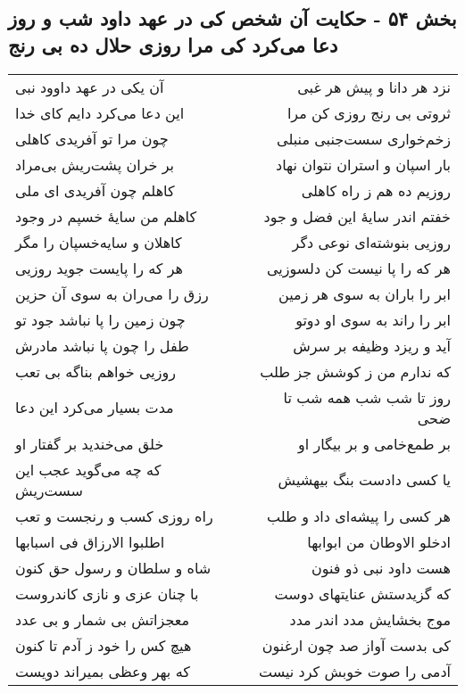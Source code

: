 \begin{center}
\section*{بخش ۵۴ - حکایت آن شخص کی در عهد داود شب و روز دعا می‌کرد کی مرا روزی حلال ده بی رنج}
\label{sec:sh054}
\begin{longtable}{l p{0.5cm} r}
آن یکی در عهد داوود نبی
&&
نزد هر دانا و پیش هر غبی
\\
این دعا می‌کرد دایم کای خدا
&&
ثروتی بی رنج روزی کن مرا
\\
چون مرا تو آفریدی کاهلی
&&
زخم‌خواری سست‌جنبی منبلی
\\
بر خران پشت‌ریش بی‌مراد
&&
بار اسپان و استران نتوان نهاد
\\
کاهلم چون آفریدی ای ملی
&&
روزیم ده هم ز راه کاهلی
\\
کاهلم من سایهٔ خسپم در وجود
&&
خفتم اندر سایهٔ این فضل و جود
\\
کاهلان و سایه‌خسپان را مگر
&&
روزیی بنوشته‌ای نوعی دگر
\\
هر که را پایست جوید روزیی
&&
هر که را پا نیست کن دلسوزیی
\\
رزق را می‌ران به سوی آن حزین
&&
ابر را باران به سوی هر زمین
\\
چون زمین را پا نباشد جود تو
&&
ابر را راند به سوی او دوتو
\\
طفل را چون پا نباشد مادرش
&&
آید و ریزد وظیفه بر سرش
\\
روزیی خواهم بناگه بی تعب
&&
که ندارم من ز کوشش جز طلب
\\
مدت بسیار می‌کرد این دعا
&&
روز تا شب شب همه شب تا ضحی
\\
خلق می‌خندید بر گفتار او
&&
بر طمع‌خامی و بر بیگار او
\\
که چه می‌گوید عجب این سست‌ریش
&&
یا کسی دادست بنگ بیهشیش
\\
راه روزی کسب و رنجست و تعب
&&
هر کسی را پیشه‌ای داد و طلب
\\
اطلبوا الارزاق فی اسبابها
&&
ادخلو الاوطان من ابوابها
\\
شاه و سلطان و رسول حق کنون
&&
هست داود نبی ذو فنون
\\
با چنان عزی و نازی کاندروست
&&
که گزیدستش عنایتهای دوست
\\
معجزاتش بی شمار و بی عدد
&&
موج بخشایش مدد اندر مدد
\\
هیچ کس را خود ز آدم تا کنون
&&
کی بدست آواز صد چون ارغنون
\\
که بهر وعظی بمیراند دویست
&&
آدمی را صوت خوبش کرد نیست
\\

\end{longtable}
\end{center}
